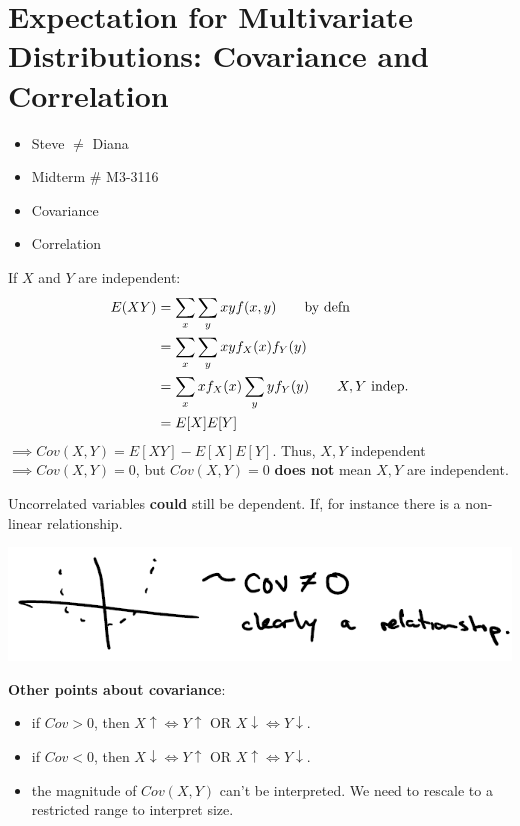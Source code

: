 \setcounter{section}{3}
\section{Expectation for Multivariate Distributions: Covariance and Correlation}
\begin{itemize}
    \item Steve $ \neq $ Diana
    \item Midterm \# M3-3116
    \item Covariance
    \item Correlation
\end{itemize}
If $ X $ and $ Y $ are independent:
\begin{align*}
    E(XY) & =
    \sum\limits_{x} \sum\limits_{y} x y f(x,y)\qquad\text{by defn} \\
          & = \sum\limits_{x} \sum\limits_{y} x y f
    _X(x)f_Y(y)                                                    \\
          & =\sum\limits_{x} x f
    _X(x) \sum\limits_{y} y f
    _Y(y)\qquad\text{$ X,Y $ indep.}                               \\
          & =E[X]E[Y]
\end{align*}
$ \implies Cov(X,Y)=E[XY]-E[X]E[Y] $. Thus, $ X,Y $ independent
$ \implies Cov(X,Y)=0 $, but $ Cov(X,Y) = 0 $ \textbf{does not}
mean $ X,Y $ are independent.

Uncorrelated variables \textbf{could} still be dependent. If, for
instance there is a non-linear relationship.

\begin{center}
    \includegraphics{covnot0.png}
\end{center}

\textbf{Other points about covariance}:
\begin{itemize}
    \item if $ Cov>0 $, then $ X\uparrow \iff Y\uparrow $ OR
          $ X\downarrow \iff Y\downarrow $.
    \item if $ Cov<0 $, then $ X\downarrow \iff Y\uparrow $ OR
          $ X\uparrow \iff Y\downarrow $.
    \item the magnitude of $ Cov(X,Y) $ can't be interpreted. We need
          to rescale to a restricted range to interpret size.
\end{itemize}

